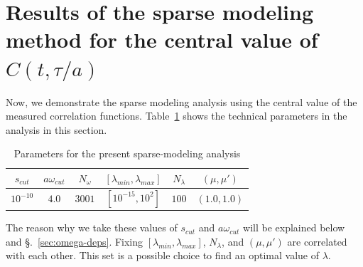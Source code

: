 \documentclass[a4paper,11pt]{article}
\begin{document}
\section{Results of the sparse modeling method for the central value of $C(t,\tau/a)$}\label{sec:SpM}
Now, we demonstrate the sparse modeling analysis using the central value of the measured correlation functions.
Table~\ref{table:parameter} shows the technical parameters in the analysis in this section.
\begin{table}[h]
\begin{center}
\begin{tabular}{|c|c|c|c|c|c|}
\hline
 $s_{cut}$ & $a \omega_{cut}$  & $N_\omega$  & $[\lambda_{min},\lambda_{max}]$ & $N_\lambda$  &  $(\mu,\mu')$  \\
 \hline
 $10^{-10}$ & $ 4.0 $  & $3001$  &  $ [10^{-15} , 10^{2}]$  & $100$  &  $(1.0,1.0)$  \\
 \hline
\end{tabular}
\caption{ Parameters for the present sparse-modeling analysis } \label{table:parameter}
\end{center}
\end{table}
The reason why we take these values of $s_{cut}$ and $a \omega_{cut}$ will be explained below and \S.~\ref{sec:omega-deps}.
Fixing $[\lambda_{min},\lambda_{max}]$, $N_\lambda$, and $(\mu,\mu')$ are correlated with each other. 
This set is a possible choice to find an optimal value of $\lambda$.
\end{document}
